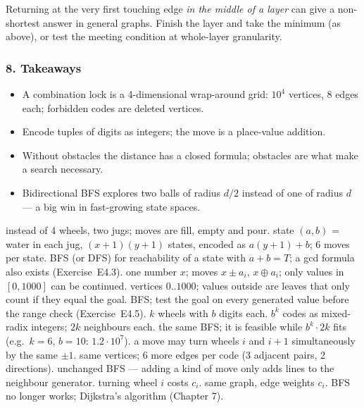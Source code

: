 \begin{warningbox}
Returning at the very first touching edge \emph{in the middle of a layer} can give a non-shortest answer in general graphs. Finish the layer and take the minimum (as above), or test the meeting condition at whole-layer granularity.
\end{warningbox}

\subsubsection*{8. Takeaways}

\begin{itemize}[leftmargin=*]
    \item A combination lock is a 4-dimensional wrap-around grid: $10^4$ vertices, 8 edges each; forbidden codes are deleted vertices.
    \item Encode tuples of digits as integers; the move is a place-value addition.
    \item Without obstacles the distance has a closed formula; obstacles are what make a search necessary.
    \item Bidirectional BFS explores two balls of radius $d/2$ instead of one of radius $d$ --- a big win in fast-growing state spaces.
\end{itemize}

\begin{variantsbox}
  {instead of 4 wheels, two jugs; moves are fill, empty and pour.}
  {state $(a, b)$ = water in each jug, $(x{+}1)(y{+}1)$ states, encoded as $a(y{+}1)+b$; 6 moves per state.}
  {BFS (or DFS) for reachability of a state with $a + b = T$; a gcd formula also exists (Exercise~E4.3).}
  {one number $x$; moves $x \pm a_i$, $x \oplus a_i$; only values in $[0, 1000]$ can be continued.}
  {vertices $0..1000$; values outside are leaves that only count if they equal the goal.}
  {BFS; test the goal on every generated value before the range check (Exercise~E4.5).}
  {$k$ wheels with $b$ digits each.}
  {$b^k$ codes as mixed-radix integers; $2k$ neighbours each.}
  {the same BFS; it is feasible while $b^k \cdot 2k$ fits (e.g.\ $k = 6$, $b = 10$: $1.2\cdot10^7$).}
  {a move may turn wheels $i$ and $i+1$ simultaneously by the same $\pm1$.}
  {same vertices; 6 more edges per code (3 adjacent pairs, 2 directions).}
  {unchanged BFS --- adding a kind of move only adds lines to the neighbour generator.}
  {turning wheel $i$ costs $c_i$.}
  {same graph, edge weights $c_i$.}
  {BFS no longer works; Dijkstra's algorithm (Chapter 7).}
\end{variantsbox}
